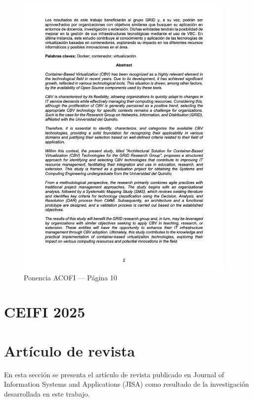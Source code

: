 \begin{figure}[H]
	\centering
	\begin{tcolorbox}[
			colback=white,
			colframe=gray!50,
			boxrule=1pt,
			arc=2pt,
			boxsep=5pt,
			left=3pt,
			right=3pt,
			top=3pt,
			bottom=3pt,
			drop shadow
		]
		\includegraphics[width=0.95\textwidth,keepaspectratio]{apendices/ACOFI/pagina_10.png}
	\end{tcolorbox}
	\caption{Ponencia ACOFI --- Página 10}\label{fig:acofi-pagina-10}
\end{figure}
\FloatBarrier\section{CEIFI 2025}

\section{Artículo de revista}

En esta sección se presenta el artículo de revista publicado en Journal of Information Systems and Applications (JISA) como resultado de la investigación desarrollada en este trabajo.

